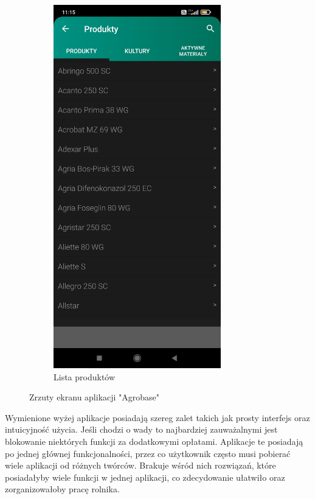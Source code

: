 \documentclass[a4paper,12pt,oneside]{book}
\begin{document}
\begin{figure}[H]
\begin{subfigure}{.5\textwidth}
			\includegraphics[width=0.8\textwidth]{grafika/db_2.jpg}
			\caption{Lista produktów}
		\end{subfigure}
		\caption{Zrzuty ekranu aplikacji "Agrobase"}
	\end{figure}

	Wymienione wyżej aplikacje posiadają szereg zalet takich jak prosty interfejs oraz intuicyjność użycia. Jeśli chodzi o wady to najbardziej zauważalnymi jest blokowanie niektórych funkcji za dodatkowymi opłatami. Aplikacje te posiadają po jednej głównej funkcjonalności, przez co użytkownik często musi pobierać wiele aplikacji od różnych twórców. Brakuje wśród nich rozwiązań, które posiadałyby wiele funkcji w jednej aplikacji, co zdecydowanie ułatwiło oraz zorganizowałoby pracę rolnika.
	
\end{document}
